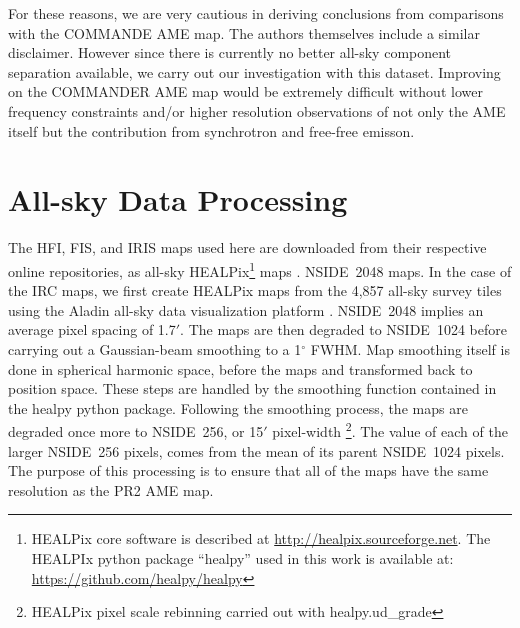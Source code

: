         For these reasons, we are very cautious in deriving conclusions from comparisons with the COMMANDE AME map. The authors themselves include a similar disclaimer. However since there is currently no better all-sky component separation available, we carry out our investigation with this dataset. Improving on the COMMANDER AME map would be extremely difficult without lower frequency constraints and/or higher resolution observations of not only the AME itself but the contribution from synchrotron and free-free emisson.


  \section{All-sky Data Processing}

        The HFI, FIS, and IRIS maps used here are downloaded from their respective online repositories, as all-sky HEALPix\footnote{HEALPix core software is described at \url{http://healpix.sourceforge.net}. The HEALPIx python package ``healpy'' used in this work is available at: \url{https://github.com/healpy/healpy}} maps \citep{gorski05}.   NSIDE~2048 maps. In the case of the IRC maps, we first create HEALPix maps from the 4,857 all-sky survey tiles using the Aladin all-sky data visualization platform \citep{bonnarel00}. NSIDE~2048 implies an average pixel spacing of 1.7$'$. The maps are then degraded to NSIDE~1024 before carrying out a Gaussian-beam smoothing to a 1$^{\circ}$ FWHM. Map smoothing itself is done in spherical harmonic space, before the maps and transformed back to position space. These steps are handled by the smoothing function contained in the healpy python package. Following the smoothing process, the maps are degraded once more to NSIDE~256, or 15$'$ pixel-width \footnote{HEALPix pixel scale rebinning carried out with healpy.ud\_grade}. The value of each of the larger NSIDE~256 pixels, comes from the mean of its parent NSIDE~1024 pixels. The purpose of this processing is to ensure that all of the maps have the same resolution as the PR2 AME map.
